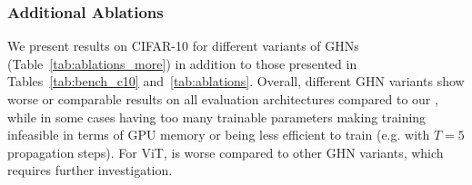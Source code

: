 \subsubsection{Additional Ablations\label{apdx:ablations}}

We present results on CIFAR-10 for different variants of GHNs (Table~\ref{tab:ablations_more}) in addition to those presented in Tables~\ref{tab:bench_c10} and~\ref{tab:ablations}.
Overall, different GHN variants show worse or comparable results on all evaluation architectures compared to our \ghnours, while in some cases having too many trainable parameters making training infeasible in terms of GPU memory or being less efficient to train (e.g. with $T=5$ propagation steps).
For ViT, \ghnours is worse compared to other GHN variants, which requires further investigation.

